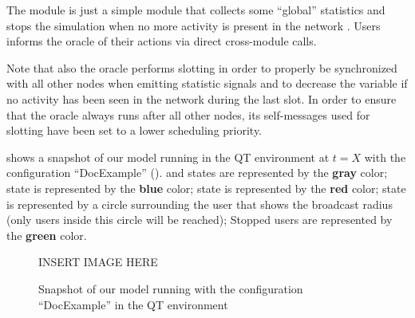 The  module is just a simple module that collects some ``global''
statistics and stops the simulation when no more activity is present in the
network . Users informs the oracle
of their actions via direct cross-module calls.

Note that also the oracle performs slotting in order to properly be synchronized
with all other nodes when emitting statistic signals and to decrease the
 variable if no activity has been seen in the network during the
last slot. In order to ensure that the oracle always runs after all other nodes,
its self-messages used for slotting have been set to a lower scheduling
priority.

 shows a snapshot of our model running in the \omnetpp{} QT
environment at \(t = X\) with the configuration ``DocExample''
().  and  states are represented by
the \textcolor{idle}{\textbf{gray}} color;  state is represented
by the \textcolor{hearing}{\textbf{blue}} color;  state is
represented by the \textcolor{collision}{\textbf{red}} color; 
state is represented by a circle surrounding the user that shows the broadcast
radius (only users inside this circle will be reached); Stopped users are
represented by the \textcolor{relayed}{\textbf{green}} color.

\begin{figure}[htb]
	\centering
	INSERT IMAGE HERE
	\caption{Snapshot of our model running with the configuration
	``DocExample'' in the \omnetpp{} QT environment}\label{fig:snapshot}
\end{figure}
